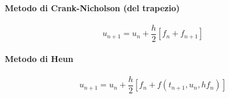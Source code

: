 \paragraph{Metodo di Crank-Nicholson (del trapezio)}
\begin{equation}
    u_{n+1} = u_n + \frac{h}{2} \left[f_n+f_{n+1}\right]
\end{equation}
\paragraph{Metodo di Heun}
\begin{equation}
    u_{n+1} = u_n + \frac{h}{2} \left[f_n+f(t_{n+1},u_n,hf_n)\right]
\end{equation}


